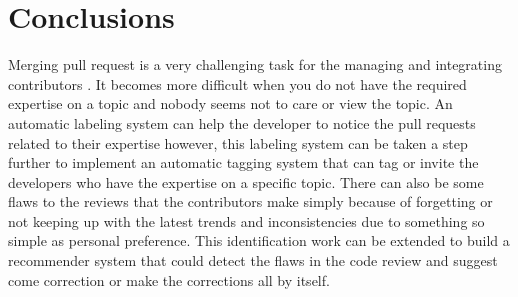 \section{Conclusions}
\label{sect:conclusions}
Merging pull request is a very challenging task for the managing and integrating contributors \cite{Gousios2015}. It becomes more difficult when you do not have the required expertise on a topic and nobody seems not to care or view the topic. An automatic labeling system can help the developer to notice the pull requests related to their expertise however, this labeling system can be taken a step further to implement an automatic tagging system that can tag or invite the developers who have the expertise on a specific topic. There can also be some flaws to the reviews that the contributors make simply because of forgetting or not keeping up with the latest trends and inconsistencies due to something so simple as personal preference. This identification work can be extended to build a recommender system that could detect the flaws in the code review and suggest come correction or make the corrections all by itself. 
